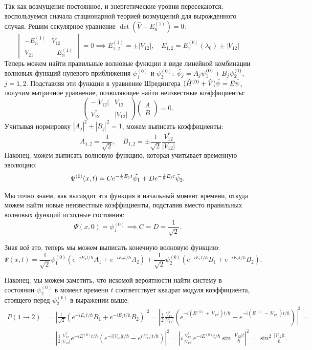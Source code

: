 Так как возмущение постоянное, и энергетические уровни пересекаются,
воспользуемся сначала стационарной теорией возмущений для вырожденного случая.
Решим секулярное уравнение $\det(\hat{V}-E_n^{(1)}) = 0$:
\[
  \begin{vmatrix}
    -E_n^{(1)} & V_{12} \\ V_{21} & -E_n^{(1)}
  \end{vmatrix} = 0 \implies E_{1,2}^{(1)} = \pm |V_{12}|, \quad E_{1,2} = E_1^{(0)}(\lambda_0)\pm|V_{12}|
\]
Теперь можем найти правильные волновые функции в виде линейной комбинации
волновых функций нулевого приближения $\psi_1^{(0)}$ и $\psi_2^{(0)}$:
$\Tilde{\psi}_j = A_j\psi_1^{(0)}+B_j\psi_2^{(0)}$, $j = 1,2$. Подставляя эти
функции в уравнение Шредингера $(\hat{H}^{(0)}+\hat{V})\Tilde{\psi} =
  E\Tilde{\psi}$, получим матричное уравнение, позволяющее найти неизвестные
коэффициенты:
\[
  \begin{pmatrix}
    -|V_{12}|&V_{12} \\ V^{*}_{12}&|V_{12}|
  \end{pmatrix}\begin{pmatrix}
    A\\B
  \end{pmatrix} = 0 .
\]
Учитывая нормировку $|A_j|^2+|B_j|^2 = 1$, можем выписать коэффициенты:
\[
  A_{1,2} = \frac{1}{\sqrt{2}}, \quad B_{1,2} = \pm \frac{1}{\sqrt{2}}\frac{V_{12}^{*}}{|V_{12}|}
\]
Наконец, можем выписать волновую функцию, которая учитывает временную эволюцию:
\[
  \Psi^{(0)}(x,t) = Ce^{-\frac{i}{\hbar}E_1 t}\Tilde{\psi_1}+De^{-\frac{i}{\hbar}E_2 t}\Tilde{\psi}_2.
\]

Мы точно знаем, как выглядит эта функция в начальный момент времени, откуда
можем найти новые неизвестные коэффициенты, подставив вместо правильных
волновых функций исходные состояния:
\[
  \Psi(x, 0) = \psi_1^{(0)}\implies C=D=\frac{1}{\sqrt{2}}.
\]

Зная всё это, теперь мы можем выписать конечную волновую функцию:
\[
  \Psi(x,t)=\frac{1}{\sqrt{2}}\psi_1^{(0)}\left(e^{-iE_1 t/\hbar}A_1+e^{-iE_2t/\hbar}A_2\right)+\frac{1}{\sqrt{2}}\psi_2^{(0)}\left(e^{-iE_1 t/\hbar}B_1+e^{-iE_2t/\hbar}B_2\right).
\]

Наконец, мы можем заметить, что искомой вероятности найти систему в состоянии
$\psi_2^{(0)}$ в момент времени $t$ соответствует квадрат модуля коэффициента,
стоящего перед $\psi_2^{(0)}$ в выражении выше:
\begin{align*}
  P(1\to2)&=\left|\frac{1}{\sqrt{2}}\left(e^{-iE_1 t/\hbar}B_1+e^{-iE_2t/\hbar}B_2\right)\right|^2 = \left|\frac{1}{2}\frac{V_{12}^{*}}{|V_{12}|}\left(e^{-i(E^{(0)}+|V_{12}|)t/\hbar}-e^{-i(E^{(0)}-|V_{12}|)t/\hbar}\right)\right|^2 =\\
  &= \left|\frac{1}{2}\frac{V_{12}^{*}}{|V_{12}|}e^{-iE^{(0)}t/\hbar}\left(e^{-i|V_{12}|t/\hbar}-e^{i|V_{12}|t/\hbar}\right)\right|^2 = \left|i\frac{V_{12}^{*}}{|V_{12}|}e^{-iE^{(0)}t/\hbar}\sin\frac{|V_{12}|t}{\hbar}\right|^2 = \sin^2\frac{|V_{12}|t}{\hbar}.
\end{align*}
\qedsq

